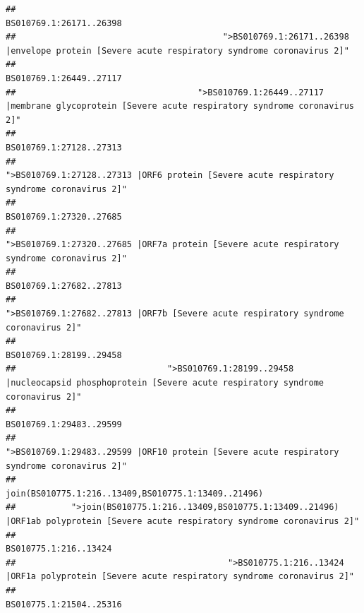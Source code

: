 \documentclass[
]{article}
\begin{document}
\begin{verbatim}
##                                                                                                                BS010769.1:26171..26398 
##                                         ">BS010769.1:26171..26398 |envelope protein [Severe acute respiratory syndrome coronavirus 2]" 
##                                                                                                                BS010769.1:26449..27117 
##                                    ">BS010769.1:26449..27117 |membrane glycoprotein [Severe acute respiratory syndrome coronavirus 2]" 
##                                                                                                                BS010769.1:27128..27313 
##                                             ">BS010769.1:27128..27313 |ORF6 protein [Severe acute respiratory syndrome coronavirus 2]" 
##                                                                                                                BS010769.1:27320..27685 
##                                            ">BS010769.1:27320..27685 |ORF7a protein [Severe acute respiratory syndrome coronavirus 2]" 
##                                                                                                                BS010769.1:27682..27813 
##                                                    ">BS010769.1:27682..27813 |ORF7b [Severe acute respiratory syndrome coronavirus 2]" 
##                                                                                                                BS010769.1:28199..29458 
##                              ">BS010769.1:28199..29458 |nucleocapsid phosphoprotein [Severe acute respiratory syndrome coronavirus 2]" 
##                                                                                                                BS010769.1:29483..29599 
##                                            ">BS010769.1:29483..29599 |ORF10 protein [Severe acute respiratory syndrome coronavirus 2]" 
##                                                                                    join(BS010775.1:216..13409,BS010775.1:13409..21496) 
##           ">join(BS010775.1:216..13409,BS010775.1:13409..21496) |ORF1ab polyprotein [Severe acute respiratory syndrome coronavirus 2]" 
##                                                                                                                  BS010775.1:216..13424 
##                                          ">BS010775.1:216..13424 |ORF1a polyprotein [Severe acute respiratory syndrome coronavirus 2]" 
##                                                                                                                BS010775.1:21504..25316 

\end{verbatim}
\end{document}
